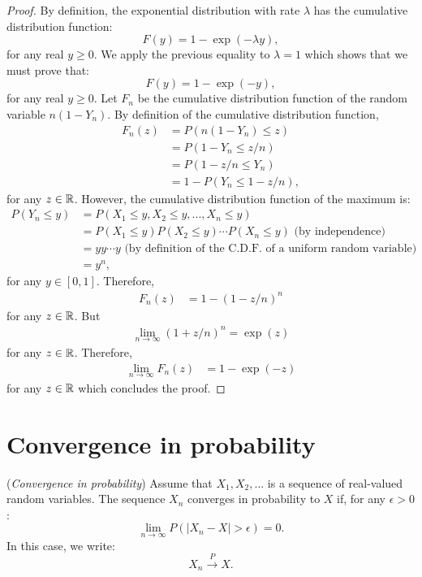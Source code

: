 \documentclass{article}
\begin{document}
\begin{proof}
By definition, the exponential distribution with rate $\lambda$ has the cumulative distribution function:
$$
F(y) = 1 - \exp(-\lambda y),
$$
for any real $y\geq 0$.
We apply the previous equality to $\lambda=1$ which shows that we must prove that:
$$
F(y) = 1 - \exp(-y),
$$
for any real $y\geq 0$. 
Let $F_n$ be the cumulative distribution function of the random variable $n(1-Y_n)$. 
By definition of the cumulative distribution function, 
\begin{align*}
F_n(z) 
&= P(n(1-Y_n)\leq z) \\
&= P(1-Y_n\leq z/n) \\
&= P(1-z/n\leq Y_n) \\
&= 1-P(Y_n\leq 1-z/n),
\end{align*}
for any $z\in\mathbb{R}$. 
However, the cumulative distribution function of the maximum is: 
\begin{align*}
P(Y_n\leq y)
& = P(X_1\leq y, X_2\leq y,..., X_n\leq y) \\
& = P(X_1\leq y)P(X_2\leq y) \cdots P(X_n\leq y) \textrm{ (by independence)}\\
& = y y \cdots y \textrm{ (by definition of the C.D.F. of a uniform random variable)}\\
& = y^n,
\end{align*}
for any $y\in[0,1]$. 
Therefore, 
\begin{align*}
F_n(z) 
&= 1-(1-z/n)^n
\end{align*}
for any $z\in\mathbb{R}$. 
But 
\begin{align*}
\lim_{n\rightarrow \infty} (1+z/n)^n = \exp(z)
\end{align*}
for any $z\in\mathbb{R}$. 
Therefore,
\begin{align*}
\lim_{n\rightarrow\infty} F_n(z) 
&= 1-\exp(-z)
\end{align*}
for any $z\in\mathbb{R}$ which concludes the proof.
\end{proof}


\section{Convergence in probability}

\begin{definition}
(\emph{Convergence in probability})
Assume that $X_1,X_2,...$ is a sequence of real-valued random variables. 
The sequence $X_n$ converges in probability to $X$ if, for any $\epsilon>0$:
$$
\lim_{n\rightarrow \infty} P(|X_n-X|>\epsilon)=0.
$$
In this case, we write:
$$
X_n \xrightarrow{P} X.
$$
\end{definition}
\end{document}
